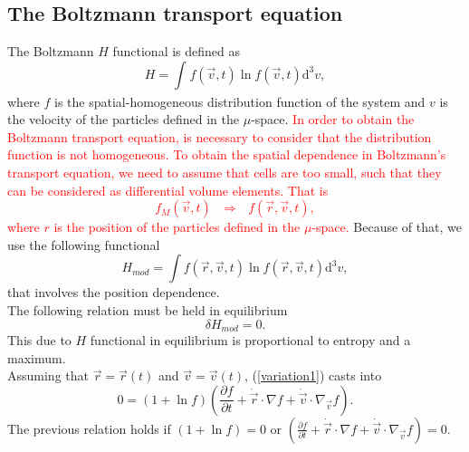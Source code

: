 \documentclass{article}
\begin{document}
\subsection{The Boltzmann transport equation}
The Boltzmann $H$ functional is defined as
\begin{equation}
    H=\int_{}^{}f(\vec{v},t)\ln f(\vec{v},t)\mathrm{d}^{3}v,
\end{equation}
where $f$ is the spatial-homogeneous distribution function of the system and $v$ is the velocity of the particles defined in the $\mu$-space. \textcolor{red}{In order to obtain the Boltzmann transport equation, is necessary to consider that the distribution function is not homogeneous. To obtain the spatial dependence in Boltzmann's transport equation, we need to assume that cells are too small, such that they can be considered as differential volume elements. That is
\begin{equation}
    f_M(\vec{v},t)    \ \ \ \Rightarrow \ \ \ f(\vec{r},\vec{v},t),
\end{equation}
where $r$ is the position of the particles defined in the $\mu$-space.} Because of that, we use the following functional
\begin{equation}
    H_{mod}=\int f(\vec{r},\vec{v},t) \ln f(\vec{r},\vec{v},t) \mathrm{d}^{3}v,
\end{equation}
that involves the position dependence.
\\
The following relation must be held in equilibrium 
\begin{equation}
    \delta H_{mod}=0.\label{variation1}
\end{equation}
This due to $H$ functional in equilibrium is proportional to entropy and a maximum.\\ 
Assuming that $\vec{r}=\vec{r}(t)$ and $\vec{v}=\vec{v}(t)$, (\ref{variation1}) casts into
\begin{equation}
    0=\left( 1+\ln f \right)\left( \frac{\partial f}{\partial t}+\dot{\vec{r}}\cdot \nabla f+\dot{\vec{v}}\cdot \nabla_{\vec{v}} f \right).
\end{equation}
The previous relation holds if $(1+\ln f)=0$ or $(\frac{\partial f}{\partial t}+\dot{\vec{r}}\cdot \nabla f+\dot{\vec{v}}\cdot \nabla_{\vec{v}} f)=0$.\\
\end{document}
